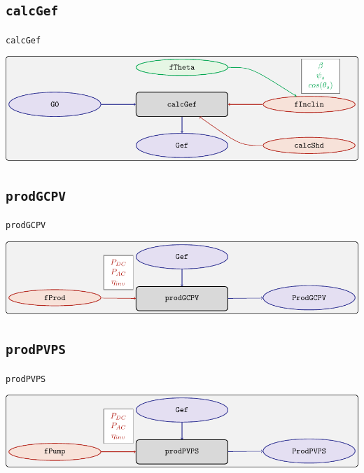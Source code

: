 \documentclass[aspectratio=169, usenames,svgnames,dvipsnames]{beamer}
\begin{document}
\subsection{\texttt{calcGef}}
\label{sec:org837481b}
\begin{frame}[label={sec:orgc7a1e1a},fragile]{\texttt{calcGef}}
 \begin{center}
\includegraphics[width=\textwidth]{../figuras/calcgef.pdf}
\end{center}
\end{frame}
\subsection{\texttt{prodGCPV}}
\label{sec:org949da93}
\begin{frame}[label={sec:orgbae3f07},fragile]{\texttt{prodGCPV}}
 \begin{center}
\includegraphics[width=\textwidth]{../figuras/prodgcpv.pdf}
\end{center}
\end{frame}
\subsection{\texttt{prodPVPS}}
\label{sec:orgafcc4ac}
\begin{frame}[label={sec:orgd5a905f},fragile]{\texttt{prodPVPS}}
 \begin{center}
\includegraphics[width=\textwidth]{../figuras/prodpvps.pdf}
\end{center}
\end{frame}
\end{document}
